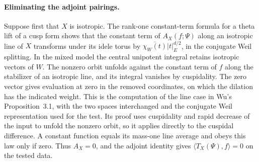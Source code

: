 \paragraph{Eliminating the adjoint pairings.}
Suppose first that \(X\) is isotropic. The rank-one constant-term
formula for a theta lift of a cusp form shows that the constant term
of \(A_X(f;\Psi)\) along an isotropic line of \(X\) transforms under
its idele torus by \(\overline{\chi_W(t)}|t|_E^{d/2}\), in the
conjugate Weil splitting. In
the mixed model the central unipotent integral retains isotropic
vectors of \(W\). The nonzero orbit unfolds against the constant
term of \(f\) along the stabilizer of an isotropic line, and its
integral vanishes by cuspidality. The zero vector gives evaluation
at zero in the removed coordinates, on which the dilation has the
indicated weight. This is the computation of the line case in
Wu's Proposition~3.1, with the two spaces interchanged and the
conjugate Weil representation used for the test. Its proof uses
cuspidality and rapid decrease of the input to unfold the nonzero
orbit, so it applies directly to the cuspidal difference. A constant
function equals its mass-one line average and obeys this law only
if zero. Thus \(A_X=0\), and the adjoint identity gives
\(\langle T_X(\Psi),f\rangle=0\) on the tested data.
\cite[Proposition~3.1 and (3.4)]{p2wu-unitary-tower}

